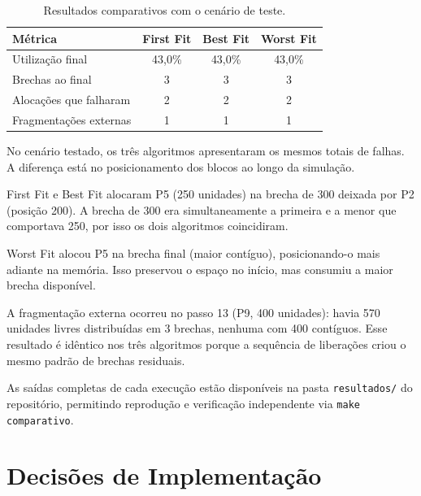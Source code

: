 \documentclass[12pt]{article}
\begin{document}
\begin{table}[htb]
\centering
\caption{Resultados comparativos com o cenário de teste.}
\label{tab:resultados}
\begin{tabular}{lccc}
\toprule
\textbf{Métrica} & \textbf{First Fit} & \textbf{Best Fit} & \textbf{Worst Fit} \\
\midrule
Utilização final         & 43,0\% & 43,0\% & 43,0\% \\
Brechas ao final         & 3      & 3      & 3      \\
Alocações que falharam   & 2      & 2      & 2      \\
Fragmentações externas   & 1      & 1      & 1      \\
\bottomrule
\end{tabular}
\end{table}

No cenário testado, os três algoritmos apresentaram os mesmos totais de falhas. A diferença está no posicionamento dos blocos ao longo da simulação.

First Fit e Best Fit alocaram P5 (250 unidades) na brecha de 300 deixada por P2 (posição 200). A brecha de 300 era simultaneamente a primeira e a menor que comportava 250, por isso os dois algoritmos coincidiram.

Worst Fit alocou P5 na brecha final (maior contíguo), posicionando-o mais adiante na memória. Isso preservou o espaço no início, mas consumiu a maior brecha disponível.

A fragmentação externa ocorreu no passo 13 (P9, 400 unidades): havia 570 unidades livres distribuídas em 3 brechas, nenhuma com 400 contíguos. Esse resultado é idêntico nos três algoritmos porque a sequência de liberações criou o mesmo padrão de brechas residuais.

As saídas completas de cada execução estão disponíveis na pasta \texttt{resultados/} do repositório, permitindo reprodução e verificação independente via \texttt{make comparativo}.

\section{Decisões de Implementação}
\end{document}
